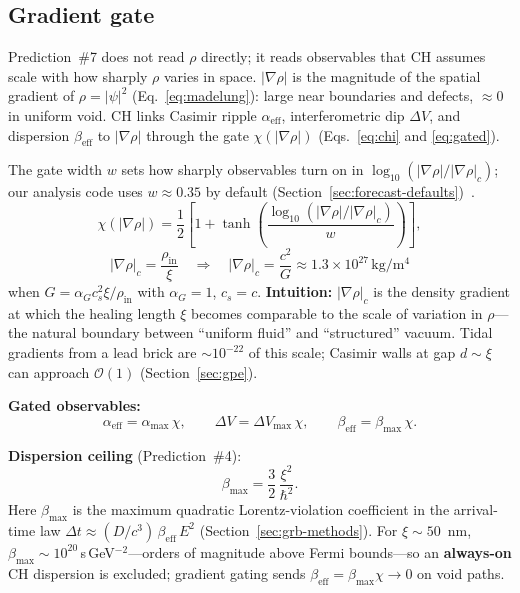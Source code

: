 \documentclass[11pt,a4paper]{article}
\begin{document}
\subsection{Gradient gate}

Prediction~\#7 does not read $\rho$ directly; it reads observables that CH assumes scale with how sharply $\rho$ varies in space.
$|\nabla\rho|$ is the magnitude of the spatial gradient of $\rho = |\psi|^2$ (Eq.~\ref{eq:madelung}): large near boundaries and defects, $\approx 0$ in uniform void.
CH links Casimir ripple $\alpha_{\mathrm{eff}}$, interferometric dip $\Delta V$, and dispersion $\beta_{\mathrm{eff}}$ to $|\nabla\rho|$ through the gate $\chi(|\nabla\rho|)$ (Eqs.~\ref{eq:chi} and \ref{eq:gated}).

The gate width $w$ sets how sharply observables turn on in $\log_{10}(|\nabla\rho|/|\nabla\rho|_c)$; our analysis code uses $w \approx 0.35$ by default (Section~\ref{sec:forecast-defaults})~\cite{CHSpaceFabric2026}.
\begin{equation}
  \chi(|\nabla\rho|) = \frac{1}{2}\left[1 + \tanh\!\left(\frac{\log_{10}(|\nabla\rho|/|\nabla\rho|_c)}{w}\right)\right],
  \label{eq:chi}
\end{equation}
\begin{equation}
  |\nabla\rho|_c = \frac{\rho_{\mathrm{in}}}{\xi}
  \quad\Rightarrow\quad
  |\nabla\rho|_c = \frac{c^2}{G} \approx 1.3\times 10^{27}\,\si{\kilogram\per\meter\tothe{4}}
  \label{eq:grad-crit}
\end{equation}
when $G = \alpha_G c_s^2 \xi/\rho_{\mathrm{in}}$ with $\alpha_G = 1$, $c_s = c$.
\textbf{Intuition:} $|\nabla\rho|_c$ is the density gradient at which the healing length $\xi$ becomes comparable to the scale of variation in $\rho$---the natural boundary between ``uniform fluid'' and ``structured'' vacuum.
Tidal gradients from a lead brick are $\sim 10^{-22}$ of this scale; Casimir walls at gap $d \sim \xi$ can approach $\mathcal{O}(1)$ (Section~\ref{sec:gpe}).

\textbf{Gated observables:}
\begin{equation}
  \alpha_{\mathrm{eff}} = \alpha_{\max}\,\chi, \qquad
  \Delta V = \Delta V_{\max}\,\chi, \qquad
  \beta_{\mathrm{eff}} = \beta_{\max}\,\chi.
  \label{eq:gated}
\end{equation}

\textbf{Dispersion ceiling} (Prediction~\#4):
\begin{equation}
  \beta_{\max} = \frac{3}{2}\,\frac{\xi^2}{\hbar^2}.
  \label{eq:beta-max}
\end{equation}
Here $\beta_{\max}$ is the maximum quadratic Lorentz-violation coefficient in the arrival-time law $\Delta t \approx (D/c^3)\,\beta_{\mathrm{eff}}\,E^2$ (Section~\ref{sec:grb-methods}).
For $\xi \sim 50$~nm, $\beta_{\max} \sim 10^{20}$\,s\,GeV$^{-2}$---orders of magnitude above Fermi bounds---so an \textbf{always-on} CH dispersion is excluded; gradient gating sends $\beta_{\mathrm{eff}} = \beta_{\max}\chi \to 0$ on void paths.
\end{document}
